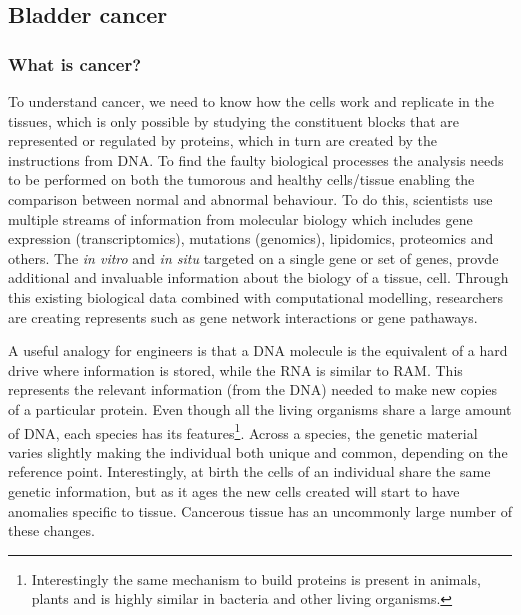 
\subsection{Bladder cancer} \label{s:lit:biology}

\vspace{3mm}
\vspace{3mm}

\subsubsection{What is cancer?}

To understand cancer, we need to know how the cells work and replicate in the tissues, which is only possible by studying the constituent blocks that are represented or regulated by proteins, which in turn are created by the instructions from DNA. To find the faulty biological processes the analysis needs to be performed on both the tumorous and healthy cells/tissue enabling the comparison between normal and abnormal behaviour. To do this, scientists use multiple streams of information from molecular biology which includes gene expression (transcriptomics), mutations (genomics), lipidomics, proteomics and others. The \textit{in vitro} and \textit{in situ} targeted on a single gene or set of genes, provde additional and invaluable information about the biology of a tissue, cell. Through this existing biological data combined with computational modelling, researchers are creating represents such as gene network interactions or gene pathaways. 

A useful analogy for engineers is that a DNA molecule is the equivalent of a hard drive where information is stored, while the RNA is similar to RAM. This represents the relevant information (from the DNA) needed to make new copies of a particular protein. Even though all the living organisms share a large amount of DNA, each species has its features\footnote{Interestingly the same mechanism to build proteins is present in animals, plants and is highly similar in bacteria and other living organisms.}. Across a species, the genetic material varies slightly making the individual both unique and common, depending on the reference point. Interestingly, at birth the cells of an individual share the same genetic information, but as it ages the new cells created will start to have anomalies specific to tissue. Cancerous tissue has an uncommonly large number of these changes.

